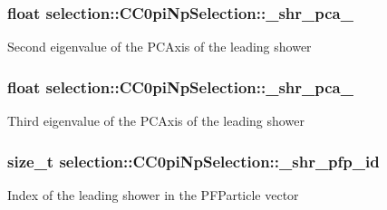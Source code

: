 \subsubsection[{\texorpdfstring{\+\_\+shr\+\_\+pca\+\_\+1}{_shr_pca_1}}]{\setlength{\rightskip}{0pt plus 5cm}float selection\+::\+C\+C0pi\+Np\+Selection\+::\+\_\+shr\+\_\+pca\+\_\hspace{0.3cm}{\ttfamily [private]}}\hypertarget{classselection_1_1CC0piNpSelection_ae3ce85b9e7002cfac57e433ee131868d}{}\label{classselection_1_1CC0piNpSelection_ae3ce85b9e7002cfac57e433ee131868d}
Second eigenvalue of the P\+C\+Axis of the leading shower 
\subsubsection[{\texorpdfstring{\+\_\+shr\+\_\+pca\+\_\+2}{_shr_pca_2}}]{\setlength{\rightskip}{0pt plus 5cm}float selection\+::\+C\+C0pi\+Np\+Selection\+::\+\_\+shr\+\_\+pca\+\_\hspace{0.3cm}{\ttfamily [private]}}\hypertarget{classselection_1_1CC0piNpSelection_a7e5a1ac6cd32eec7da00eb45c49df0cd}{}\label{classselection_1_1CC0piNpSelection_a7e5a1ac6cd32eec7da00eb45c49df0cd}
Third eigenvalue of the P\+C\+Axis of the leading shower 
\subsubsection[{\texorpdfstring{\+\_\+shr\+\_\+pfp\+\_\+id}{_shr_pfp_id}}]{\setlength{\rightskip}{0pt plus 5cm}size\+\_\+t selection\+::\+C\+C0pi\+Np\+Selection\+::\+\_\+shr\+\_\+pfp\+\_\+id\hspace{0.3cm}{\ttfamily [private]}}\hypertarget{classselection_1_1CC0piNpSelection_a21f98860ef8bd0ad8d8e029a47ef6f1e}{}\label{classselection_1_1CC0piNpSelection_a21f98860ef8bd0ad8d8e029a47ef6f1e}
Index of the leading shower in the P\+F\+Particle vector 
